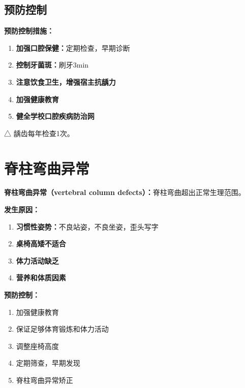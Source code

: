 \subsection{预防控制}

\begin{keybox}
\textbf{预防控制措施：}
\begin{enumerate}[leftmargin=*]
    \item \textbf{加强口腔保健：}定期检查，早期诊断
    \item \textbf{控制牙菌斑：}刷牙3min
    \item \textbf{注意饮食卫生，增强宿主抗龋力}
    \item \textbf{加强健康教育}
    \item \textbf{健全学校口腔疾病防治网}
\end{enumerate}
\end{keybox}

\begin{exambox}
△ 龋齿每年检查1次。
\end{exambox}

\section{脊柱弯曲异常}\difficulty

\begin{defbox}
\textbf{脊柱弯曲异常（vertebral column defects）：}脊柱弯曲超出正常生理范围。
\end{defbox}

\begin{keybox}
\textbf{发生原因：}
\begin{enumerate}[leftmargin=*]
    \item \textbf{习惯性姿势：}不良站姿，不良坐姿，歪头写字
    \item \textbf{桌椅高矮不适合}
    \item \textbf{体力活动缺乏}
    \item \textbf{营养和体质因素}
\end{enumerate}

\textbf{预防控制：}
\begin{enumerate}[leftmargin=*]
    \item 加强健康教育
    \item 保证足够体育锻炼和体力活动
    \item 调整座椅高度
    \item 定期筛查，早期发现
    \item 脊柱弯曲异常矫正
\end{enumerate}
\end{keybox}

